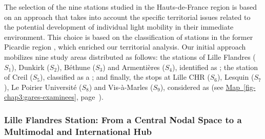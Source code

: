 \begin{refsegment}
The selection of the nine stations studied in the Hauts-de-France region is based on an approach that takes into account the specific territorial issues related to the potential development of individual light mobility in their immediate environment. This choice is based on the classification of stations in the former Picardie region \textcolor{blue}{\autocite[2-4]{cete_nord_picardie_profils_2011}}, which enriched our territorial analysis. Our initial approach mobilizes nine study areas distributed as follows: the stations of Lille Flandres (\(S_1\)), Dunkirk (\(S_2\)), Béthune (\(S_3\)) and Armentières (\(S_4\)), identified as ; the station of Creil (\(S_5\)), classified as a ; and finally, the stops at Lille CHR (\(S_6\)), Lesquin (\(S_7\)), Le Poirier Université (\(S_8\)) and Vis-à-Marles (\(S_9\)), considered as  (see \hyperref[fig-chap3:gares-examinees]{Map~\ref{fig-chap3:gares-examinees}}, page~\pageref{fig-chap3:gares-examinees}).%

\subsubsection*{Lille Flandres Station: From a Central Nodal Space to a Multimodal and International Hub
    \label{chap3:application-observation-quantitative-lille-flandres}
    }


\end{refsegment}
